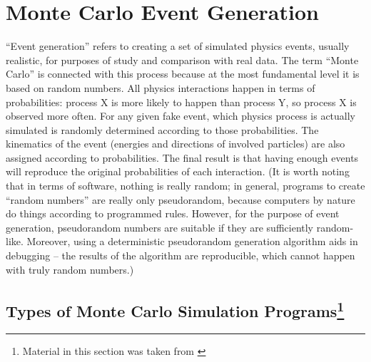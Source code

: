 \section{Monte Carlo Event Generation}
\label{sim:MC}

``Event generation'' refers to 
creating a set of 
simulated %
physics events, 
usually realistic, 
for purposes of study and 
comparison with real data.  
The term ``Monte Carlo'' is connected 
with this process 
because at the most fundamental level 
it is based on random numbers.  
All physics interactions happen in 
terms of probabilities: 
process X is more likely to happen than 
process Y, 
so process X is observed more often.  
For any given fake event, 
which physics process is actually simulated 
is randomly determined 
according to those probabilities.  
The kinematics of the event 
(energies and directions of 
involved particles) 
are also assigned according to 
probabilities.  
The final result is that having enough events 
will reproduce the original probabilities 
of each interaction.  
(It is worth noting that in terms of software, 
nothing is really random; in general, 
programs to create ``random numbers''
are really only pseudorandom, 
because computers by nature 
do things according to programmed rules.  
However, for the purpose of event generation, 
pseudorandom numbers are suitable if 
they are sufficiently random-like.  
Moreover, using a deterministic 
pseudorandom generation algorithm 
aids in debugging -- 
the results of the algorithm are reproducible, 
which cannot happen with truly random numbers.)  




\subsection[Types of Monte Carlo Simulation Programs]{Types of Monte Carlo Simulation Programs\protect\footnote{Material in this section was taken from \cite{MCLesHouchesGuide}}}
\label{sim:MCexplain}

